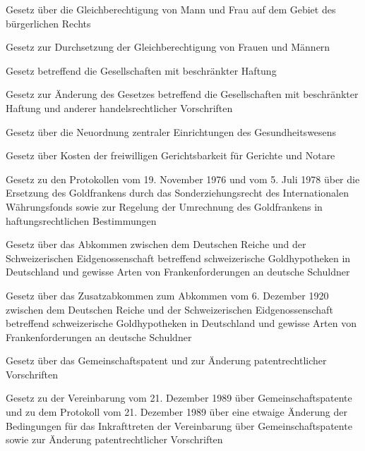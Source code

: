 \item[{GleichberG}] Gesetz über die Gleichberechtigung von Mann und Frau auf dem Gebiet des bürgerlichen Rechts

\item[{GleichberG-2}] Gesetz zur Durchsetzung der Gleichberechtigung von Frauen und Männern

\item[{GmbHG}] Gesetz betreffend die Gesellschaften mit beschränkter Haftung

\item[{GmbHGuaÄndG}] Gesetz zur Änderung des Gesetzes betreffend die Gesellschaften mit beschränkter Haftung und anderer handelsrechtlicher Vorschriften

\item[{GNG}] Gesetz über die Neuordnung zentraler Einrichtungen des Gesundheitswesens

\item[{GNotKG}] Gesetz über Kosten der freiwilligen Gerichtsbarkeit für Gerichte und Notare

\item[{GoldfrUmrG}] Gesetz zu den Protokollen vom 19. November 1976 und vom 5. Juli 1978 über die Ersetzung des Goldfrankens durch das Sonderziehungsrecht des Internationalen Währungsfonds sowie zur Regelung der Umrechnung des Goldfrankens in haftungsrechtlichen Bestimmungen

\item[{GoldHypAbkCHEG}] Gesetz über das Abkommen zwischen dem Deutschen Reiche und der Schweizerischen Eidgenossenschaft betreffend schweizerische Goldhypotheken in Deutschland und gewisse Arten von Frankenforderungen an deutsche Schuldner

\item[{GoldHypZusAbkGCHEG}] Gesetz über das Zusatzabkommen zum Abkommen vom 6. Dezember 1920 zwischen dem Deutschen Reiche und der Schweizerischen Eidgenossenschaft betreffend schweizerische Goldhypotheken in Deutschland und gewisse Arten von Frankenforderungen an deutsche Schuldner

\item[{GPatG}] Gesetz über das Gemeinschaftspatent und zur Änderung patentrechtlicher Vorschriften

\item[{GPatG-2}] Gesetz zu der Vereinbarung vom 21. Dezember 1989 über Gemeinschaftspatente und zu dem Protokoll vom 21. Dezember 1989 über eine etwaige Änderung der Bedingungen für das Inkrafttreten der Vereinbarung über Gemeinschaftspatente sowie zur Änderung patentrechtlicher Vorschriften

